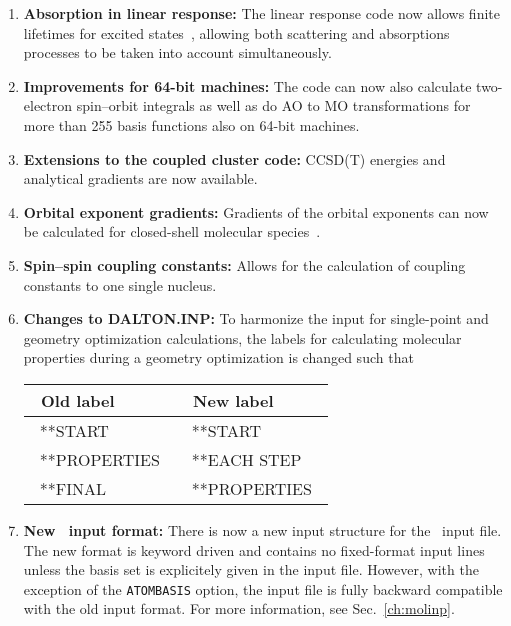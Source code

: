 \begin{enumerate}
\item{\bf Absorption in linear response:} The linear response code now
  allows finite lifetimes for excited states~\cite{pndmbhjajjojcp115}, allowing both scattering
  and absorptions processes to be taken into account simultaneously.

\item{\bf Improvements for 64-bit machines:} The code can now also
  calculate two-electron spin--orbit integrals as well as do AO to MO
  transformations for more than 255 basis functions also on 64-bit
  machines.

\item{\bf Extensions to the coupled cluster code:} CCSD(T) energies
  and analytical gradients are now available.

\item{\bf Orbital exponent gradients:} Gradients of the orbital
exponents can now be calculated for closed-shell molecular
species~\cite{fjthjcp121}.

\item{\bf Spin--spin coupling constants:} Allows for the calculation
  of coupling constants to one single nucleus.

\item{\bf Changes to DALTON.INP:} To harmonize the input for
  single-point and geometry optimization calculations, the labels for
  calculating  molecular properties during a geometry optimization is
  changed such that

\begin{center}
\begin{tabular}{|l|l|}\hline
\ Old label     & \ New label     \\\hline
\ **START       & \ **START       \\
\ **PROPERTIES\ & \ **EACH STEP   \\
\ **FINAL       & \ **PROPERTIES\ \\\hline
\end{tabular}
\end{center}

\item{\bf New \mol\ input format:} There is now a new input structure
  for the \mol\ input file. The new format is keyword driven and
  contains no fixed-format input lines unless the basis set is
  explicitely given in the input file. However, with the exception of
  the \verb|ATOMBASIS| option, the input file is fully backward
  compatible with the old input format. For more information, see
  Sec.~\ref{ch:molinp}.


\end{enumerate}
